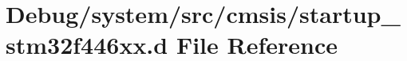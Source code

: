 \hypertarget{startup__stm32f446xx_8d}{}\section{Debug/system/src/cmsis/startup\+\_\+stm32f446xx.d File Reference}
\label{startup__stm32f446xx_8d}
